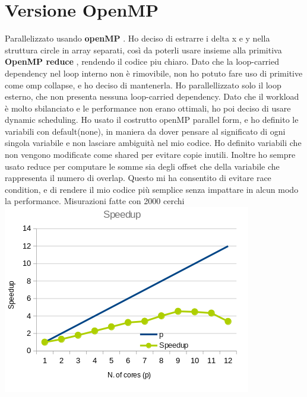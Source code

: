 \documentclass[a4paper,12pt, twoside]{report}
\begin{document}
\section*{Versione OpenMP}
Parallelizzato usando \textbf{openMP} \cite{openMP}.
Ho deciso di estrarre i delta x e y nella struttura circle in array separati, così da poterli usare insieme alla primitiva \textbf{OpenMP reduce} \cite{omp_reduce}, rendendo il codice piu chiaro.
Dato che la loop-carried dependency nel loop interno non è rimovibile, non ho potuto fare uso di primitive come omp collapse, e ho deciso di mantenerla.
Ho parallellizzato solo il loop esterno, che non presenta nessuna loop-carried dependency.
Dato che il workload è molto sbilanciato e le performance non erano ottimali, ho poi deciso di usare dynamic scheduling.
Ho usato il costrutto openMP parallel form, e ho definito le variabili con default(none), in maniera da dover pensare al significato di ogni singola variabile e non lasciare ambiguità nel mio codice. Ho definito variabili che non vengono modificate come shared per evitare copie inutili.
Inoltre ho sempre usato  reduce per computare le somme sia degli offset che della variabile che rappresenta il numero di overlap.
Questo mi ha consentito di evitare race condition, e di rendere il mio codice più semplice senza impattare in alcun modo la performance.
Misurazioni fatte con 2000 cerchi
\newline
\includegraphics[scale=0.5]{images/omp_speedup.png}
\end{document}
